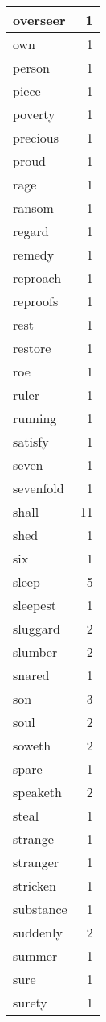 \begin{center}
\begin{longtable}{l|r}
overseer & 1\\ \hline 
own & 1\\ \hline 
person & 1\\ \hline 
piece & 1\\ \hline 
poverty & 1\\ \hline 
precious & 1\\ \hline 
proud & 1\\ \hline 
rage & 1\\ \hline 
ransom & 1\\ \hline 
regard & 1\\ \hline 
remedy & 1\\ \hline 
reproach & 1\\ \hline 
reproofs & 1\\ \hline 
rest & 1\\ \hline 
restore & 1\\ \hline 
roe & 1\\ \hline 
ruler & 1\\ \hline 
running & 1\\ \hline 
satisfy & 1\\ \hline 
seven & 1\\ \hline 
sevenfold & 1\\ \hline 
shall & 11\\ \hline 
shed & 1\\ \hline 
six & 1\\ \hline 
sleep & 5\\ \hline 
sleepest & 1\\ \hline 
sluggard & 2\\ \hline 
slumber & 2\\ \hline 
snared & 1\\ \hline 
son & 3\\ \hline 
soul & 2\\ \hline 
soweth & 2\\ \hline 
spare & 1\\ \hline 
speaketh & 2\\ \hline 
steal & 1\\ \hline 
strange & 1\\ \hline 
stranger & 1\\ \hline 
stricken & 1\\ \hline 
substance & 1\\ \hline 
suddenly & 2\\ \hline 
summer & 1\\ \hline 
sure & 1\\ \hline 
surety & 1\\ \hline 

\end{longtable}
\end{center}
